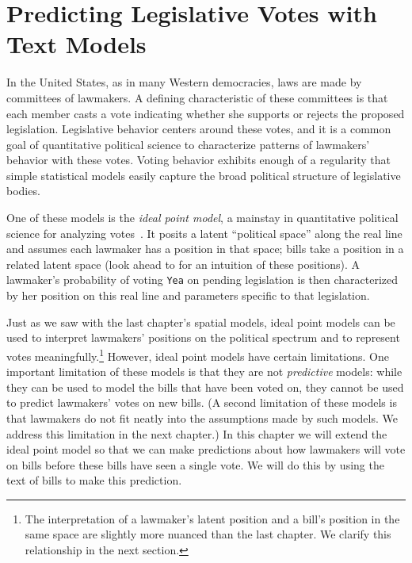 \chapter{Predicting Legislative Votes with Text Models}
\label{chapter:predicting_votes}

In the United States, as in many Western democracies, laws are made by
committees of lawmakers.  A defining characteristic of these
committees is that each member casts a vote indicating whether she
supports or rejects the proposed legislation. Legislative behavior
centers around these votes, and it is a common goal of quantitative
political science to characterize patterns of lawmakers' behavior with
these votes. Voting behavior exhibits enough of a regularity that
simple statistical models easily capture the broad political structure
of legislative bodies.

One of these models is the \emph{ideal point model}, a mainstay in
quantitative political science for analyzing
votes~\citep{clinton:2004}.  It posits a latent ``political space''
along the real line and assumes each lawmaker has a position in that
space; bills take a position in a related latent space (look ahead to
 for an intuition of these positions).
A lawmaker's probability of voting \verb!Yea! on pending legislation
is then characterized by her position on this real line and parameters
specific to that legislation.

Just as we saw with the last chapter's spatial models, ideal point
models can be used to interpret lawmakers' positions on the political
spectrum and to represent votes meaningfully.\footnote{The
  interpretation of a lawmaker's latent position and a bill's position
  in the same space are slightly more nuanced than the last chapter.
  We clarify this relationship in the next section.}  However, ideal
point models have certain limitations.  One important limitation of
these models is that they are not \emph{predictive} models: while they
can be used to model the bills that have been voted on, they cannot be
used to predict lawmakers' votes on new bills.  (A second limitation
of these models is that lawmakers do not fit neatly into the
assumptions made by such models.  We address this limitation in the
next chapter.)  In this chapter we will extend the ideal point model
so that we can make predictions about how lawmakers will vote on bills
before these bills have seen a single vote.  We will do this by using
the text of bills to make this prediction.

